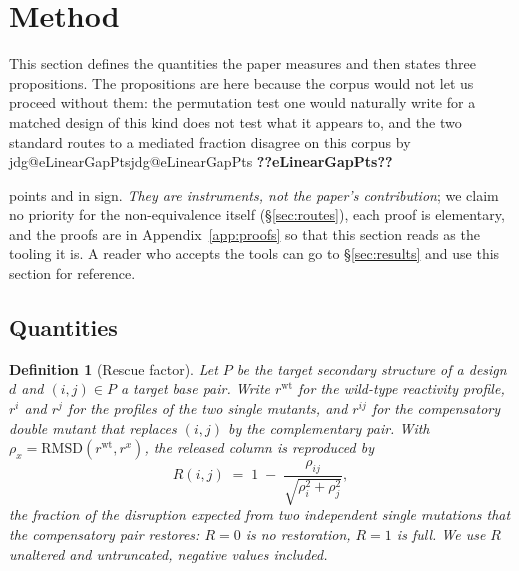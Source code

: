 \documentclass[11pt]{article}
\makeatletter
\newtheorem{definition}{Definition}
\newcommand{\jdg}[1]{%
  \ifcsname jdg@#1\endcsname\csname jdg@#1\endcsname
  \else\textbf{??#1??}\PackageError{rna}{undefined measured quantity #1}{}\fi}
\makeatother
\begin{document}
\section{Method}
\label{sec:method}

\noindent This section defines the quantities the paper measures and then states three
propositions. The propositions are here because the corpus would not let us proceed without them:
the permutation test one would naturally write for a matched design of this kind does not test
what it appears to, and the two standard routes to a mediated fraction disagree on this corpus by
\jdg{eLinearGapPts} points and in sign. \emph{They are instruments, not the paper's contribution};
we claim no priority for the non-equivalence itself (\S\ref{sec:routes}), each proof is elementary,
and the proofs are in Appendix~\ref{app:proofs} so that this section reads as the tooling it is. A
reader who accepts the tools can go to \S\ref{sec:results} and use this section for reference.

\subsection{Quantities}
\label{sec:quantities}

\begin{definition}[Rescue factor]
\label{def:rf}
Let $P$ be the target secondary structure of a design $d$ and $(i,j)\in P$ a target base pair.
Write $r^{\mathrm{wt}}$ for the wild-type reactivity profile, $r^{i}$ and $r^{j}$ for the profiles
of the two single mutants, and $r^{ij}$ for the compensatory double mutant that replaces $(i,j)$
by the complementary pair. With $\rho_x=\mathrm{RMSD}(r^{\mathrm{wt}},r^{x})$, the released column is
reproduced by
\begin{equation}
R(i,j) \;=\; 1 \;-\; \frac{\rho_{ij}}{\sqrt{\rho_i^{2}+\rho_j^{2}}},
\label{eq:rf}
\end{equation}
the fraction of the disruption expected from two independent single mutations that the
compensatory pair restores: $R=0$ is no restoration, $R=1$ is full. We use $R$ unaltered and
untruncated, negative values included.
\end{definition}
\end{document}
